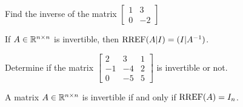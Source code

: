 \begin{applicationActivities}{3}{23}
\begin{activity}{15}
  Find the inverse of the matrix $\begin{bmatrix} 1 & 3 \\ 0 & -2 \end{bmatrix}$
\end{activity}

\begin{observation}
If $A \in \mathbb{R}^{n \times n}$ is invertible, then $\operatorname{RREF}(A|I) = (I | A^{-1} )$.
\end{observation}

\begin{activity}{15}
Determine if the matrix $\begin{bmatrix} 2 & 3 & 1 \\ -1 & -4 & 2 \\ 0 & -5 & 5 \end{bmatrix}$ is invertible or not.
\end{activity}

\begin{observation}
 A matrix $A \in \mathbb{R}^{n \times n}$ is invertible if and only if $\operatorname{RREF}(A) = I_n$.
\end{observation}

\end{applicationActivities}
